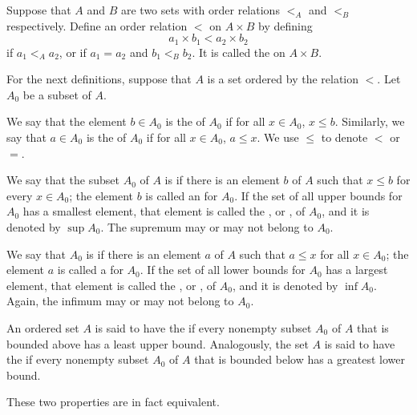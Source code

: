     \begin{definition}
        Suppose that $A$ and $B$ are two sets with order relations $<_A$ and $<_B$ respectively. Define an order relation $<$ on $A \times B$ by defining \begin{equation*}
            a_1\times b_1 < a_2\times b_2
        \end{equation*}
        if $a_1 <_A a_2$, or if $a_1 = a_2$ and $b_1 <_B b_2$. It is called the  on $A\times B$.
    \end{definition}

    
    For the next definitions, suppose that $A$ is a set ordered by the relation $<$. Let $A_0$ be a subset of $A$.


    \begin{definition}
        We say that the element $b \in A_0$ is the  of $A_0$ if for all $x \in A_0$, $x \leq b$. Similarly, we say that $a \in A_0$ is the  of $A_0$ if for all $x \in A_0$, $a \leq x$. We use $\leq$ to denote $<$ or $=$.
    \end{definition}


    \begin{definition}
        We say that the subset $A_0$ of $A$ is  if there is an element $b$ of $A$ such that $x \leq b$ for every $x \in A_0$; the element $b$ is called an  for $A_0$. If the set of all upper bounds for $A_0$ has a smallest element, that element is called the , or , of $A_0$, and it is denoted by $\sup A_0$. The supremum may or may not belong to $A_0$.
    \end{definition}


    \begin{definition}
        We say that $A_0$ is  if there is an element $a$ of $A$ such that $a \leq x$ for all $x \in A_0$; the element $a$ is called a  for $A_0$. If the set of all lower bounds for $A_0$ has a largest element, that element is called the , or , of $A_0$, and it is denoted by $\inf A_0$. Again, the infimum may or may not belong to $A_0$.
    \end{definition}


    \begin{definition}
        An ordered set $A$ is said to have the  if every nonempty subset $A_0$ of $A$ that is bounded above has a least upper bound. Analogously, the set $A$ is said to have the  if every nonempty subset $A_0$ of $A$ that is bounded below has a greatest lower bound. 

        These two properties are in fact equivalent.
    \end{definition}



